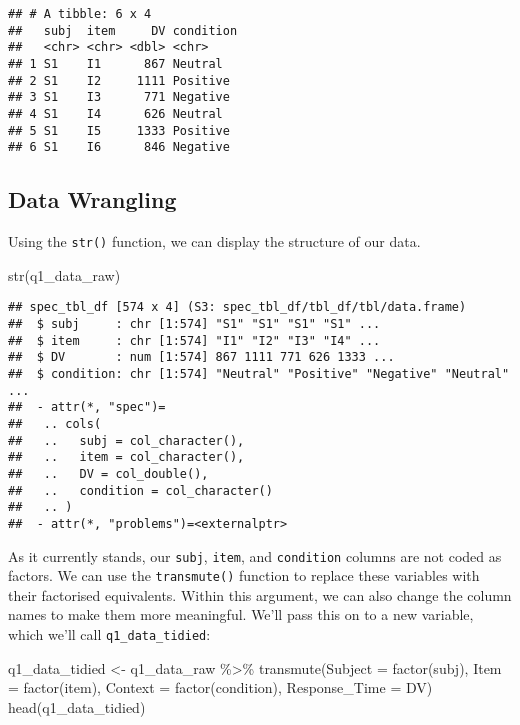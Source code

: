 \documentclass[
]{article}
\newenvironment{Shaded}{\begin{snugshade}}{\end{snugshade}}
\newcommand{\AttributeTok}[1]{\textcolor[rgb]{0.77,0.63,0.00}{#1}}
\newcommand{\FunctionTok}[1]{\textcolor[rgb]{0.00,0.00,0.00}{#1}}
\newcommand{\NormalTok}[1]{#1}
\newcommand{\OtherTok}[1]{\textcolor[rgb]{0.56,0.35,0.01}{#1}}
\newcommand{\SpecialCharTok}[1]{\textcolor[rgb]{0.00,0.00,0.00}{#1}}
\begin{document}
\begin{verbatim}
## # A tibble: 6 x 4
##   subj  item     DV condition
##   <chr> <chr> <dbl> <chr>    
## 1 S1    I1      867 Neutral  
## 2 S1    I2     1111 Positive 
## 3 S1    I3      771 Negative 
## 4 S1    I4      626 Neutral  
## 5 S1    I5     1333 Positive 
## 6 S1    I6      846 Negative
\end{verbatim}

\hypertarget{data-wrangling}{%
\subsection{Data Wrangling}\label{data-wrangling}}

Using the \texttt{str()} function, we can display the structure of our
data.

\begin{Shaded}
\begin{Highlighting}[]
\FunctionTok{str}\NormalTok{(q1\_data\_raw)}
\end{Highlighting}
\end{Shaded}

\begin{verbatim}
## spec_tbl_df [574 x 4] (S3: spec_tbl_df/tbl_df/tbl/data.frame)
##  $ subj     : chr [1:574] "S1" "S1" "S1" "S1" ...
##  $ item     : chr [1:574] "I1" "I2" "I3" "I4" ...
##  $ DV       : num [1:574] 867 1111 771 626 1333 ...
##  $ condition: chr [1:574] "Neutral" "Positive" "Negative" "Neutral" ...
##  - attr(*, "spec")=
##   .. cols(
##   ..   subj = col_character(),
##   ..   item = col_character(),
##   ..   DV = col_double(),
##   ..   condition = col_character()
##   .. )
##  - attr(*, "problems")=<externalptr>
\end{verbatim}

As it currently stands, our \texttt{subj}, \texttt{item}, and
\texttt{condition} columns are not coded as factors. We can use the
\texttt{transmute()} function to replace these variables with their
factorised equivalents. Within this argument, we can also change the
column names to make them more meaningful. We'll pass this on to a new
variable, which we'll call \texttt{q1\_data\_tidied}:

\begin{Shaded}
\begin{Highlighting}[]
\NormalTok{q1\_data\_tidied }\OtherTok{\textless{}{-}}\NormalTok{ q1\_data\_raw }\SpecialCharTok{\%\textgreater{}\%} 
  \FunctionTok{transmute}\NormalTok{(}\AttributeTok{Subject =} \FunctionTok{factor}\NormalTok{(subj),}
         \AttributeTok{Item =} \FunctionTok{factor}\NormalTok{(item),}
         \AttributeTok{Context =} \FunctionTok{factor}\NormalTok{(condition),}
         \AttributeTok{Response\_Time =}\NormalTok{ DV)}
\FunctionTok{head}\NormalTok{(q1\_data\_tidied)}
\end{Highlighting}
\end{Shaded}
\end{document}
